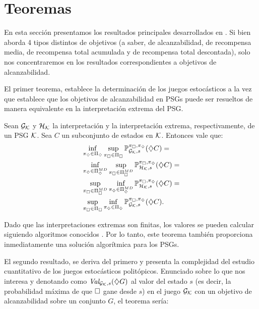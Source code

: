 
\section{Teoremas}

En esta sección presentamos los resultados principales desarrollados en
\cite{Polytopal}. Si bien \cite{Polytopal} aborda 4 tipos distintos de
objetivos (a saber, de alcanzabilidad, de recompensa media, de recompensa total
acumulada y de recompensa total descontada), solo nos concentraremos en los
resultados correspondientes a objetivos de alcanzabilidad.

El primer teorema, establece la determinación de los juegos estocásticos a la
vez que establece que los objetivos de alcanzabilidad en PSGs puede ser
resueltos de manera equivalente en la interpretación extrema del PSG.

\begin{theorem}
	Sean $\mathcal{G}_{\mathcal{K}}$ y $\mathcal{H}_{\mathcal{K}}$ la interpretación y la interpretación extrema, respectivamente, de un PSG $\mathcal{K}$. Sea $C$ un subconjunto de estados en $\mathcal{K}$. Entonces vale que:
	\begin{align*}
		&\inf_{\pi_\diamondsuit \in \Pi_\diamondsuit} \sup_{\pi_\square \in \Pi_\square} \mathbb{P}_{\mathcal{G}_{\mathcal{K}}, s}^{\pi_\square, \pi_\diamondsuit}(\diamondsuit C) = \\
		&\inf_{\pi_\diamondsuit \in \Pi_\diamondsuit^{MD}} \sup_{\pi_\square \in \Pi_\square^{MD}} \mathbb{P}_{\mathcal{H}_{\mathcal{K}}, s}^{\pi_\square, \pi_\diamondsuit}(\diamondsuit C) = \\
		&\sup_{\pi_\square \in \Pi_\square^{MD}} \inf_{\pi_\diamondsuit \in \Pi_\diamondsuit^{MD}} \mathbb{P}_{\mathcal{H}_{\mathcal{K}}, s}^{\pi_\square, \pi_\diamondsuit}(\diamondsuit C) = \\
		&\sup_{\pi_\square \in \Pi_\square} \inf_{\pi_\diamondsuit \in \Pi_\diamondsuit} \mathbb{P}_{\mathcal{G}_{\mathcal{K}}, s}^{\pi_\square, \pi_\diamondsuit}(\diamondsuit C).
	\end{align*}
\end{theorem}

Dado que las interpretaciones extremas son finitas, los valores se pueden
calcular siguiendo algoritmos conocidos \cite{CONDON1992,filar}. Por lo tanto,
este teorema también proporciona inmediatamente una solución algorítmica para
los PSGs.

El segundo resultado, se deriva del primero y presenta la complejidad del
estudio cuantitativo de los juegos estocásticos politópicos. Enunciado sobre lo
que nos interesa y denotando como $\textit{Val}_{\mathcal{G}_{\mathcal{K}},s}(\diamondsuit G)$ al valor del estado
$s$ (es decir, la probabilidad máxima de que $\square$ gane desde $s$) en el
juego $\mathcal{G}_{\mathcal{K}}$ con un objetivo de alcanzabilidad sobre un conjunto $G$, el teorema
sería:

